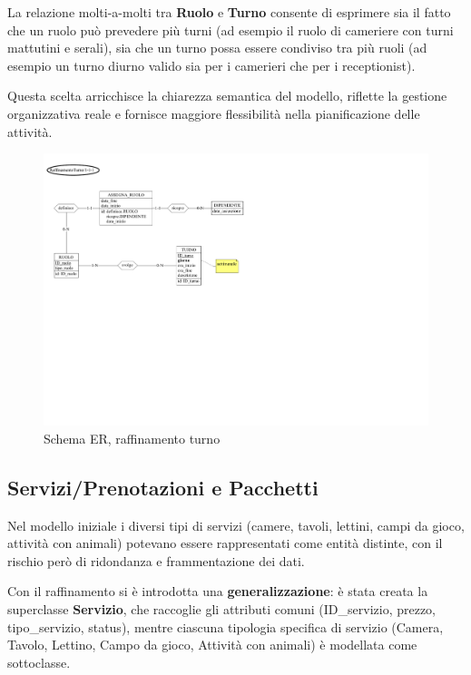 \documentclass[a4paper,12pt]{report}
\begin{document}
\vspace{\baselineskip}
La relazione molti-a-molti tra \textbf{Ruolo} e \textbf{Turno} consente di esprimere sia il fatto
che un ruolo può prevedere più turni (ad esempio il ruolo di cameriere con turni mattutini e serali),
sia che un turno possa essere condiviso tra più ruoli (ad esempio un turno diurno valido sia
per i camerieri che per i receptionist).

Questa scelta arricchisce la chiarezza semantica del modello, riflette la gestione organizzativa reale
e fornisce maggiore flessibilità nella pianificazione delle attività.

\begin{figure}[H]
	\centering
	\includegraphics[width=\textwidth, trim=0 250pt 375pt 0, clip]{./pdf/raffinamento turno.pdf}
	\caption{Schema ER, raffinamento turno}
	\label{fig:raffinamento-turno}
\end{figure}

\newpage

\subsection{Servizi/Prenotazioni e Pacchetti}
Nel modello iniziale i diversi tipi di servizi (camere, tavoli, lettini, campi da gioco, attività con animali) potevano essere
rappresentati come entità distinte, con il rischio però di ridondanza e frammentazione dei dati.

\vspace{\baselineskip}
Con il raffinamento si è introdotta una \textbf{generalizzazione}: è stata creata la superclasse \textbf{Servizio}, che raccoglie gli attributi comuni (ID\_servizio,
prezzo, tipo\_servizio, status), mentre ciascuna tipologia specifica di servizio (Camera, Tavolo, Lettino, Campo da gioco,
Attività con animali) è modellata come sottoclasse.
\end{document}
